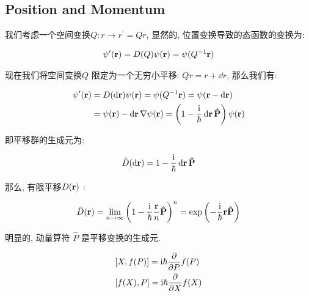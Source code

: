 \subsection{Position and Momentum}

我们考虑一个空间变换$Q:r\to r^\prime = Qr$, 显然的, 位置变换导致的态函数的变换为:

\begin{equation}
  \begin{aligned}
    \psi^{\prime}({\bf r}) = D(Q) \psi({\bf r}) = \psi(Q^{-1} {\bf r})
  \end{aligned}
\end{equation}

现在我们将空间变换$Q$ 限定为一个无穷小平移: $Qr = r+\dd r$, 那么我们有:

\begin{equation}
  \begin{aligned}
    \psi^{\prime}({\bf r}) &= D(\dd {\bf r}) \psi({\bf r}) = \psi(Q^{-1} {\bf r}) = \psi({\bf r} - \dd {\bf r}) \\
    &= \psi({\bf r}) - \dd {\bf r} \nabla \psi({\bf r}) = \left(1 - \frac{{\rm i}}{\hbar}\dd {\bf r} {\bf \hat{P}}\right)\psi({\bf r})
  \end{aligned}
\end{equation}

即平移群的生成元为:

\begin{equation}
  \begin{aligned}
    \hat{D}(\dd{\bf r}) = 1 - \frac{{\rm i}}{\hbar}\dd {\bf r} {\bf \hat{P}}
  \end{aligned}
\end{equation}

那么, 有限平移$D({\bf r})$ :

\begin{equation}
  \begin{aligned}
    \hat{D}({\bf r}) = \lim_{n\to \infty} \left(1 - \frac{{\rm i}}{\hbar} \frac{{\bf r}}{n} {\bf \hat{P}}\right)^{n} = \exp \left(- \frac{{\rm i}}{\hbar}{\bf r}{\bf \hat{P}}\right)
  \end{aligned}
\end{equation}

明显的, 动量算符 $\hat{P}$ 是平移变换的生成元.

\begin{theorem}[动量-坐标的广义对易关系]
  \begin{equation}
    \begin{aligned}
      &[X,f(P)] = {\rm i} \hbar  \pdv{}{P} f(P)\\
      &[f(X), P] = {\rm i} \hbar \pdv{}{X} f(X)
    \end{aligned}
  \end{equation}
\end{theorem}
